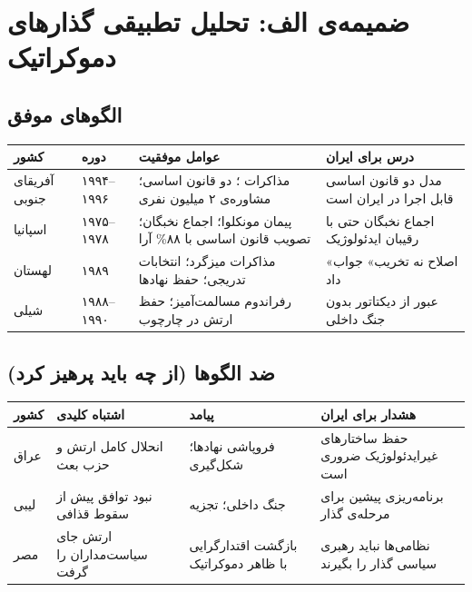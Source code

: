 \documentclass[12pt,a4paper,twoside,openany]{book}
\begin{document}
	\chapter{ضمیمه‌ی الف: تحلیل تطبیقی گذارهای دموکراتیک}
	\label{app:comparative}
	
	\section{الگوهای موفق}
	
	\vspace{0.5\baselineskip}
	\noindent
	\begin{adjustbox}{max width=\linewidth}
		\begin{tabular}{@{}p{2.5cm}p{3cm}p{4cm}p{4cm}@{}}
			\toprule
			\textbf{کشور} & \textbf{دوره} & \textbf{عوامل موفقیت} & \textbf{درس برای ایران} \\
			\midrule
			آفریقای جنوبی & ۱۹۹۴--۱۹۹۶ &
			مذاکرات ؛ دو قانون اساسی؛ مشاوره‌ی ۲ میلیون نفری &
			مدل دو قانون اساسی قابل اجرا در ایران است \\
			\addlinespace
			اسپانیا & ۱۹۷۵--۱۹۷۸ &
			پیمان مونکلوا؛ اجماع نخبگان؛ تصویب قانون اساسی با ۸۸\% آرا &
			اجماع نخبگان حتی با رقیبان ایدئولوژیک \\
			\addlinespace
			لهستان & ۱۹۸۹ &
			مذاکرات میزگرد؛ انتخابات تدریجی؛ حفظ نهادها &
			«اصلاح نه تخریب» جواب داد \\
			\addlinespace
			شیلی & ۱۹۸۸--۱۹۹۰ &
			رفراندوم مسالمت‌آمیز؛ حفظ ارتش در چارچوب &
			عبور از دیکتاتور بدون جنگ داخلی \\
			\bottomrule
		\end{tabular}
	\end{adjustbox}
	
	\section{ضد الگوها (از چه باید پرهیز کرد)}
	
	\vspace{0.5\baselineskip}
	\noindent
	\begin{adjustbox}{max width=\linewidth}
		\begin{tabular}{@{}p{2.5cm}p{3cm}p{4cm}p{4cm}@{}}
			\toprule
			\textbf{کشور} & \textbf{اشتباه کلیدی} & \textbf{پیامد} & \textbf{هشدار برای ایران} \\
			\midrule
			\rowcolor{DangerBg}
			عراق & انحلال کامل ارتش و حزب بعث &
			فروپاشی نهادها؛ شکل‌گیری \lr{ISIS} &
			حفظ ساختارهای غیرایدئولوژیک ضروری است \\
			\addlinespace
			\rowcolor{DangerBg}
			لیبی & نبود توافق پیش از سقوط قذافی &
			جنگ داخلی؛ تجزیه &
			برنامه‌ریزی پیشین برای مرحله‌ی گذار \\
			\addlinespace
			\rowcolor{DangerBg}
			مصر & ارتش جای سیاست‌مداران را گرفت &
			بازگشت اقتدارگرایی با ظاهر دموکراتیک &
			نظامی‌ها نباید رهبری سیاسی گذار را بگیرند \\
			\bottomrule
		\end{tabular}
	\end{adjustbox}
	
\end{document}
